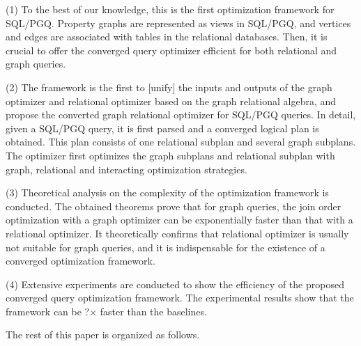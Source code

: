 (1) To the best of our knowledge, this is the first optimization framework for SQL/PGQ.
Property graphs are represented as views in SQL/PGQ, and vertices and edges are associated with tables in the relational databases.
Then, it is crucial to offer the converged query optimizer efficient for both relational and graph queries.

(2) The framework is the first to [unify] the inputs and outputs of the graph optimizer and relational optimizer based on the graph relational algebra, and propose the converted graph relational optimizer for SQL/PGQ queries.
In detail, given a SQL/PGQ query, it is first parsed and a converged logical plan is obtained.
This plan consists of one relational subplan and several graph subplans.
The optimizer first optimizes the graph subplans and relational subplan with graph, relational and interacting optimization strategies.


(3) Theoretical analysis on the complexity of the optimization framework is conducted.
The obtained theorems prove that for graph queries, the join order optimization with a graph optimizer can be exponentially faster than that with a relational optimizer. 
It theoretically confirms that relational optimizer is usually not suitable for graph queries, and it is indispensable for the existence of a converged optimization framework.

(4) Extensive experiments are conducted to show the efficiency of the proposed converged query optimization framework.
The experimental results show that the framework can be ?$\times$ faster than the baselines.

The rest of this paper is organized as follows.



